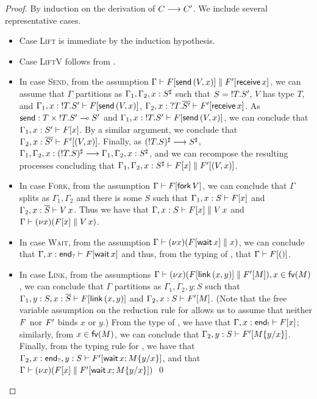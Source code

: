 \documentclass[oribibl,orivec,envcountsame]{llncs}
\begin{document}
\begin{proof}
  By induction on the derivation of $C \ceval C'$.  We include several representative cases.
  \begin{itemize}
  \item Case \textsc{Lift} is immediate by the induction hypothesis.
  \item Case \textsc{LiftV} follows from .
  \item In case \textsc{Send}, from the assumption $\Gamma \vdash \Fx[\mkwd{send}\,(V,x)] \parallel
    \Fx'[\gvconst{receive} \app x]$, we can assume that $\Gamma$ partitions as
    $\Gamma_1,\Gamma_2,x:\channel{S}$ such that $S = \gvout{T}{S'}$, $V$ has type $T$, and
    $\Gamma_1,x:\gvout{T}{S'} \vdash \Fx[\gvconst{send} \app (V,x)]$,
    $\Gamma_2,x:\gvin{T}{\gvdual{S'}} \vdash \Fx'[\gvconst{receive} \app x]$.  As $\gvconst{send} : T
    \gvtimes \gvout{T}{S'} \lto S'$ and $\Gamma_1,x:\gvout{T}{S'} \vdash \Fx[\gvconst{send} \app
    (V,x)]$, we can conclude that $\Gamma_1,x:S' \vdash \Fx[x]$.  By a similar argument, we conclude
    that $\Gamma_2,x:\gvdual{S'} \vdash \Fx'[(V,x)]$. Finally, as $\channel{(\gvout{T}{S})} \ceval
    \channel{S}$, $\Gamma_1,\Gamma_2,x:\channel{(\gvout T S)} \ceval
    \Gamma_1,\Gamma_2,x:\channel{S}$, and we can recompose the resulting processes concluding that
    $\Gamma_1,\Gamma_2,x:\channel{S} \vdash \Fx[x] \parallel \Fx'[(V,x)]$.
  \item In case \textsc{Fork}, from the assumption $\Gamma \vdash \Fx[\gvconst{fork} \app V]$, we
    can conclude that $\Gamma$ splits as $\Gamma_1,\Gamma_2$ and there is some $S$ such that
    $\Gamma_1,x:S \vdash \Fx[x]$ and $\Gamma_2,x:\gvdual{S} \vdash V \app x$.  Thus we have that
    $\Gamma,x:S \vdash \Fx[x] \parallel V \app x$ and $\Gamma \vdash (\nu x)(\Fx[x] \parallel V \app
    x)$.
  \item In case \textsc{Wait}, from the assumption $\Gamma \vdash (\nu x)(\Fx[\gvconst{wait} \app
    x] \parallel x)$, we can conclude that $\Gamma,x:\interm \vdash \Fx[\gvconst{wait} \app x]$ and
    thus, from the typing of , that $\Gamma \vdash \Fx[()]$.
  \item In case \textsc{Link}, from the assumptions $\Gamma \vdash (\nu x) (\Fx[\gvconst{link} \app
    (x, y)] \parallel \Fx'[M]), x \in \fv(M)$, we can conclude that $\Gamma$ partitions as
    $\Gamma_1,\Gamma_2,y:S$ such that $\Gamma_1,y:S,x:\gvdual{S} \vdash \Fx[\gvconst{link} \app (x,
    y)]$ and $\Gamma_2,x:S \vdash \Fx'[M]$.  (Note that the free variable assumption on the
    reduction rule for  allows us to assume that neither $\Fx$ nor $\Fx'$ binds $x$ or
    $y$.)  From the type of , we have that $\Gamma,x:\outterm \vdash \Fx[x]$;
    similarly, from $x \in \fv(M)$, we can conclude that $\Gamma_2,y:S \vdash \Fx'[M\{\bind x y\}]$.
    Finally, from the typing rule for , we have that $\Gamma_2,x:\interm,y:S \vdash
    \Fx'[\gvletunit{\gvconst{wait} \app x}{M\{\bind x y\}}]$, and that $\Gamma \vdash (\nu
    x)(\Fx[x] \parallel \Fx'[\gvletunit{\gvconst{wait} \app x}{M\{\bind x y\}}])$
  \qed
  \end{itemize}
\end{proof}
\end{document}
